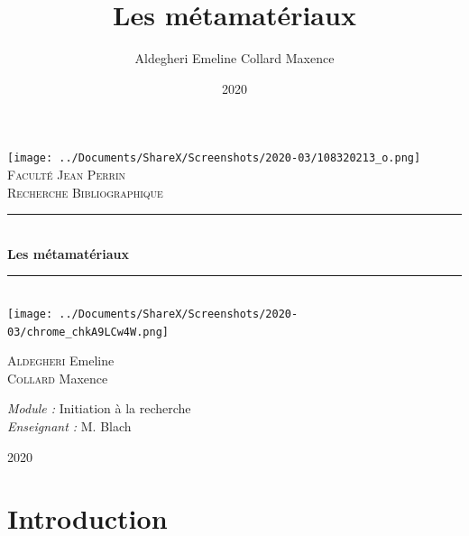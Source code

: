 \documentclass[12pt,a4paper]{article}
\title{Les métamatériaux}
\author{Aldegheri Emeline Collard Maxence}
\date{2020}
\newcommand{\HRule}{\rule{\linewidth}{0.5mm}}
\begin{document}
\begin{titlepage}
  \begin{sffamily}
  \begin{center}

	\texttt{[image: ../Documents/ShareX/Screenshots/2020-03/108320213\_o.png]}~\\[1.0cm] 
    \textsc{\LARGE Faculté Jean Perrin}\\[1.5cm]
	
    \textsc{\Large Recherche Bibliographique}\\[1.0cm]
    \HRule \\[0.4cm]
    { \huge \bfseries Les métamatériaux\\[0.4cm] }
    \HRule \\[1cm]

	\texttt{[image: ../Documents/ShareX/Screenshots/2020-03/chrome\_chkA9LCw4W.png]}~\\[1.0cm] 
    \begin{minipage}{0.4\textwidth}
      \begin{flushleft} \large
        \textsc{Aldegheri} Emeline\\
        \textsc{Collard} Maxence \\
      \end{flushleft}
    \end{minipage}
    \begin{minipage}{0.4\textwidth}
      \begin{flushright} \large
        \emph{Module :} Initiation à la recherche\\
        \emph{Enseignant : } M. Blach
      \end{flushright}
    \end{minipage}

    \vfill

    {\large  2020}

  \end{center}
  \end{sffamily}
\end{titlepage}
\tableofcontents
\newpage
\section{Introduction}
\end{document}
